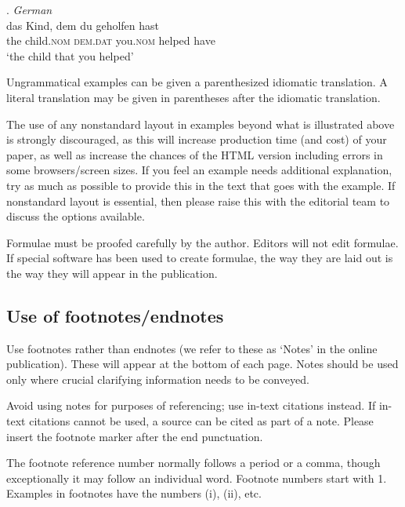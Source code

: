 \documentclass[cm,linguex]{glossa}
\begin{document}
\ex. \textit{German} \citep{coetsem:2000} \\
\gll das Kind, dem du geholfen hast\\  
the child.\textsc{nom} \textsc{dem.dat} you.\textsc{nom}  helped have\\ %
\glt `the child that you helped' %

Ungrammatical examples can be given a parenthesized idiomatic
translation. A literal translation may be given in parentheses after the
idiomatic translation.

The use of any nonstandard layout in examples beyond what is illustrated
above is strongly discouraged, as this will increase production time
(and cost) of your paper, as well as increase the chances of the HTML
version including errors in some browsers/screen sizes. If you feel an
example needs additional explanation, try as much as possible to provide
this in the text that goes with the example. If nonstandard layout is
essential, then please raise this with the editorial team to discuss the
options available.

Formulae must be proofed carefully by the author. Editors will not edit
formulae. If special software has been used to create formulae, the way
they are laid out is the way they will appear in the publication.

\hypertarget{fn}{%
\subsection{Use of footnotes/endnotes}\label{fn}}

Use footnotes rather than endnotes (we refer to these as `Notes' in the
online publication). These will appear at the bottom of each page. Notes
should be used only where crucial clarifying information needs to be
conveyed.

Avoid using notes for purposes of referencing; use in-text citations
instead. If in-text citations cannot be used, a source can be cited as
part of a note. Please insert the footnote marker after the end
punctuation.

The footnote reference number normally follows a period or a comma,
though exceptionally it may follow an individual word. Footnote numbers
start with 1. Examples in footnotes have the numbers (i), (ii), etc.
\end{document}
